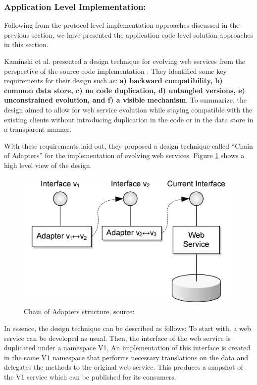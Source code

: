 \documentclass[runningheads,a4paper]{llncs}
\begin{document}
\subsubsection{Application Level Implementation:}

Following from the protocol level implementation approaches discussed in the previous section, we have presented the application code level solution approaches in this section.

Kaminski et al. presented a design technique for evolving web services from the perspective of the source code implementation \cite{kaminski2006design}. They identified some key requirements for their design such as: \textbf{a) backward compatibility, b) common data store, c) no code duplication, d) untangled versions, e) unconstrained evolution, and f) a visible mechanism}. To summarize, the design aimed to allow for web service evolution while staying compatible with the existing clients without introducing duplication in the code or in the data store in a transparent manner.

With these requirements laid out, they proposed a design technique called ``Chain of Adapters'' for the implementation of evolving web services. Figure \ref{fig:chain_of_adapters} shows a high level view of the design.

\begin{figure}[ht]
  \centering
  \includegraphics[width=\textwidth]{chain_of_adapters.png}
    \caption{Chain of Adapters structure, source: \cite{kaminski2006design}}
  \label{fig:chain_of_adapters}
\end{figure}

In essence, the design technique can be described as follows: To start with, a web service can be developed as usual. Then, the interface of the web service is duplicated under a namespace V1. An implementation of this interface is created in the same V1 namespace that performs necessary translations on the data and delegates the methods to the original web service. This produces a snapshot of the V1 service which can be published for its consumers.
\end{document}
